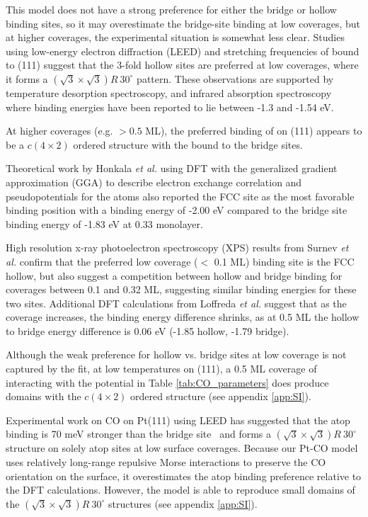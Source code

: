 This  model does not have a strong preference for
either the bridge or hollow binding sites, so it may overestimate the
bridge-site binding at low coverages, but at higher coverages, the
experimental situation is somewhat less clear.\citep{Wong:1991ta}
Studies using low-energy electron diffraction (LEED) and
 stretching frequencies of  bound to
(111) suggest that the 3-fold hollow sites are preferred at low
coverages,\citep{Bradshaw:1978uf, Conrad:1978fx, Ohtani:1987zh} where it
forms a $(\sqrt{3} \times \sqrt{3}) R~30^{\circ}$ pattern.  These
observations are supported by temperature desorption
spectroscopy,\citep{Guo:1989aa} and infrared absorption
spectroscopy~\citep{Szanyi:1992aa} where binding energies have been
reported to lie between -1.3 and -1.54 eV.

At higher  coverages (e.g. $> 0.5$ ML), the preferred binding
of  on (111) appears to be a $c(4\times2)$ ordered
structure with the  bound to the bridge
sites.\citep{Bradshaw:1978uf} 

Theoretical work by Honkala \textit{et al.}\citep{Honkala:2001sf} using
DFT with the generalized gradient approximation (GGA) to describe
electron exchange correlation and pseudopotentials for the 
atoms also reported the FCC site as the most favorable binding
position with a binding energy of -2.00 eV compared to the bridge site
binding energy of -1.83 eV at 0.33 monolayer.

High resolution x-ray photoelectron spectroscopy (XPS) results from
Surnev \textit{et al.}\citep{Surnev:2000uk} confirm that the preferred
low coverage ($< $ 0.1 ML) binding site is the FCC hollow, but also
suggest a competition between hollow and bridge binding for coverages
between 0.1 and 0.32 ML, suggesting similar binding energies for these
two sites. Additional DFT calculations from Loffreda \textit{et
al.}\citep{Loffreda:1999vl} suggest that as the coverage increases, the
binding energy difference shrinks, as at 0.5 ML the hollow to bridge
energy difference is 0.06 eV (-1.85 hollow, -1.79 bridge).

Although the weak preference for hollow vs. bridge sites at low
coverage is not captured by the  fit, at low
temperatures on (111), a 0.5 ML coverage of  interacting
with the potential in Table \ref{tab:CO_parameters} does produce
domains with the $c(4\times2)$ ordered structure (see 
appendix \ref{app:SI}).

Experimental work on CO on Pt(111) using LEED has suggested that the
atop binding is 70 meV stronger than the bridge
site~\citep{Schweizer:1989fk} and forms a
$(\sqrt{3} \times \sqrt{3}) R~30^{\circ}$ structure on solely atop
sites at low surface coverages.\citep{Kelemen:1979ad} Because our Pt-CO
model uses relatively long-range repulsive Morse interactions to
preserve the CO orientation on the surface, it overestimates the atop
binding preference relative to the DFT calculations.  However, the
model is able to reproduce small domains of the
$(\sqrt{3} \times \sqrt{3}) R~30^{\circ}$ structures (see 
appendix \ref{app:SI}).

